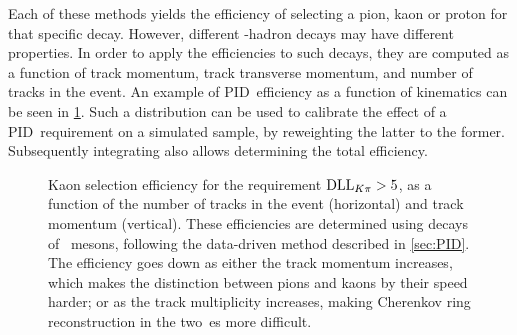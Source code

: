 Each of these methods yields the efficiency of selecting a pion, kaon or proton for that specific decay.
However, different \bquark-hadron decays may have different properties.
In order to apply the efficiencies to such decays, they are computed as a function of track momentum, track transverse momentum, and number of tracks in the event.
An example of PID~efficiency as a function of kinematics can be seen in \cref{fig:Methods_PID_hist}.
Such a distribution can be used to calibrate the effect of a PID~requirement on a simulated sample, by reweighting the latter to the former.
Subsequently integrating also allows determining the total efficiency.
%
\begin{figure}[htb] \centerfloat
    \hspace*{-1cm}
    \caption{
        Kaon selection efficiency for the requirement \({\text{DLL}_{{K}{\pi}} > 5}\), as a function of the number of tracks in the event (horizontal) and track momentum (vertical).
        These efficiencies are determined using decays of \Dstarm~mesons, following the data-driven method described in \cref{sec:PID}.
        The efficiency goes down as either the track momentum increases, which makes the distinction between pions and kaons by their speed harder; or as the track multiplicity increases, making Cherenkov ring reconstruction in the two~\rich{}es more difficult.}
    \label{fig:Methods_PID_hist}
\end{figure}

\clearpage
